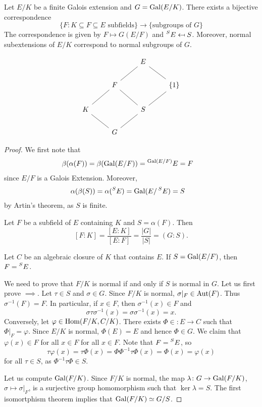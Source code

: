 
\begin{theorem}[Galois]
    Let $E/K$ be a finite Galois extension and $G=\operatorname{Gal}(E/K)$. 
    There exists a bijective correspondence
    \[
    \{F:K\subseteq F\subseteq E\text{ subfields}\}\to 
    \{\text{subgroups of $G$}\}
    \]
    The correspondence is given by $F\mapsto G(E/F)$ and 
    $\prescript{S}{}{E}\mapsfrom S$. Moreover, 
    normal subextensions of $E/K$ correspond 
    to normal subgroups of $G$. 
\end{theorem}

\[
\begin{tikzcd}
	&& E \\
	& F && {\{1\}} \\
	K && S \\
	& G
	\arrow[no head, from=1-3, to=2-2]
	\arrow[no head, from=2-2, to=3-1]
	\arrow[no head, from=3-1, to=4-2]
	\arrow[no head, from=4-2, to=3-3]
	\arrow[no head, from=2-2, to=3-3]
	\arrow[no head, from=1-3, to=2-4]
	\arrow[no head, from=2-4, to=3-3]
\end{tikzcd}
\]

\begin{proof}
We first note that
\begin{align*}
   &\beta(\alpha(F))=\beta(\operatorname{Gal}(E/F))=\prescript{\operatorname{Gal}(E/F)}{}{E}=F
\end{align*}
since $E/F$ is a Galois Extension. Moreover,
\begin{align*}
   &\alpha(\beta(S))=\alpha(\prescript{S}{}{E})=\operatorname{Gal}(E/\prescript{S}{}{E})=S
\end{align*}
by Artin's theorem, as $S$ is finite. 

Let $F$ be a subfield of $E$ containing $K$ and 
$S=\alpha(F)$. Then
\[
[F:K]=\frac{[E:K]}{[E:F]}=\frac{|G|}{|S|}=(G:S).
\]

Let $C$ be an algebraic closure of $K$ that contains $E$. 
If $S=\operatorname{Gal}(E/F)$, then $F=\prescript{S}{}{E}$. 

We need to prove that $F/K$ is normal if and only if $S$ is normal in $G$. 
Let us first prove $\implies$. Let $\tau\in S$ and $\sigma\in G$. Since
$F/K$ is normal, $\sigma|_F\in\operatorname{Aut}(F)$. Thus $\sigma^{-1}(F)=F$. In particular, 
if $x\in F$, then $\sigma^{-1}(x)\in F$ and 
\[
\sigma\tau\sigma^{-1}(x)=\sigma\sigma^{-1}(x)=x.
\]
Conversely, let $\varphi\in\operatorname{Hom}(F/K,C/K)$. There exists 
$\Phi\in\colon E\to C$ such that $\Phi|_F=\varphi$. Since $E/K$ is normal, 
$\Phi(E)=E$ and hence $\Phi\in G$. We claim that $\varphi(x)\in F$ for all $x\in F$
 for all $x\in F$. Note that $F=\prescript{S}{}{E}$, so
 \[
 \tau\varphi(x)=\tau\Phi(x)=\Phi\Phi^{-1}\tau\Phi(x)=\Phi(x)=\varphi(x)
 \]
 for all $\tau\in S$, as $\Phi^{-1}\tau\Phi\in S$. 
 
 Let us compute $\operatorname{Gal}(F/K)$. Since $F/K$ is normal, 
 the map 
 $\lambda\colon G\to\operatorname{Gal}(F/K)$, $\sigma\mapsto\sigma|_F$, 
 is a surjective group homomorphism such that $\ker\lambda=S$. The first isomortphism 
 theorem implies that $\operatorname{Gal}(F/K)\simeq G/S$. 
\end{proof}

